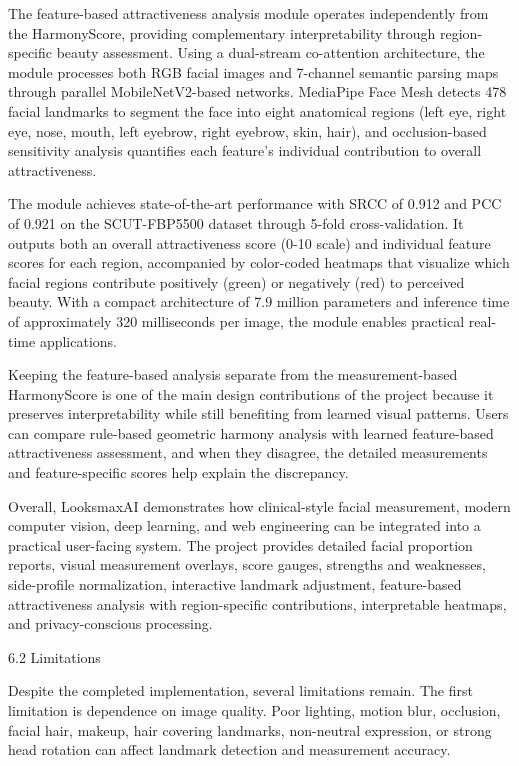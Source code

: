 The feature-based attractiveness analysis module operates independently from the HarmonyScore, providing complementary interpretability through region-specific beauty assessment. Using a dual-stream co-attention architecture, the module processes both RGB facial images and 7-channel semantic parsing maps through parallel MobileNetV2-based networks. MediaPipe Face Mesh detects 478 facial landmarks to segment the face into eight anatomical regions (left eye, right eye, nose, mouth, left eyebrow, right eyebrow, skin, hair), and occlusion-based sensitivity analysis quantifies each feature's individual contribution to overall attractiveness.

The module achieves state-of-the-art performance with SRCC of 0.912 and PCC of 0.921 on the SCUT-FBP5500 dataset through 5-fold cross-validation. It outputs both an overall attractiveness score (0-10 scale) and individual feature scores for each region, accompanied by color-coded heatmaps that visualize which facial regions contribute positively (green) or negatively (red) to perceived beauty. With a compact architecture of 7.9 million parameters and inference time of approximately 320 milliseconds per image, the module enables practical real-time applications.

Keeping the feature-based analysis separate from the measurement-based HarmonyScore is one of the main design contributions of the project because it preserves interpretability while still benefiting from learned visual patterns. Users can compare rule-based geometric harmony analysis with learned feature-based attractiveness assessment, and when they disagree, the detailed measurements and feature-specific scores help explain the discrepancy.

Overall, LooksmaxAI demonstrates how clinical-style facial measurement, modern computer vision, deep learning, and web engineering can be integrated into a practical user-facing system. The project provides detailed facial proportion reports, visual measurement overlays, score gauges, strengths and weaknesses, side-profile normalization, interactive landmark adjustment, feature-based attractiveness analysis with region-specific contributions, interpretable heatmaps, and privacy-conscious processing.

6.2  Limitations

Despite the completed implementation, several limitations remain. The first limitation is dependence on image quality. Poor lighting, motion blur, occlusion, facial hair, makeup, hair covering landmarks, non-neutral expression, or strong head rotation can affect landmark detection and measurement accuracy.

